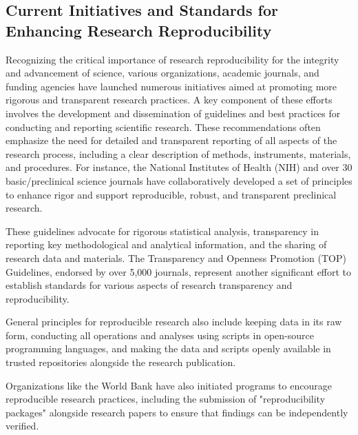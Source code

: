 \documentclass{article}
\begin{document}
\subsection{Current Initiatives and Standards for Enhancing Research Reproducibility}

Recognizing the critical importance of research reproducibility for the integrity and advancement of science, various organizations, academic journals, and funding agencies have launched numerous initiatives aimed at promoting more rigorous and transparent research practices. A key component of these efforts involves the development and dissemination of guidelines and best practices for conducting and reporting scientific research. These recommendations often emphasize the need for detailed and transparent reporting of all aspects of the research process, including a clear description of methods, instruments, materials, and procedures. For instance, the National Institutes of Health (NIH) and over 30 basic/preclinical science journals have collaboratively developed a set of principles to enhance rigor and support reproducible, robust, and transparent preclinical research.

These guidelines advocate for rigorous statistical analysis, transparency in reporting key methodological and analytical information, and the sharing of research data and materials. The Transparency and Openness Promotion (TOP) Guidelines, endorsed by over 5,000 journals, represent another significant effort to establish standards for various aspects of research transparency and reproducibility.

General principles for reproducible research also include keeping data in its raw form, conducting all operations and analyses using scripts in open-source programming languages, and making the data and scripts openly available in trusted repositories alongside the research publication.

Organizations like the World Bank have also initiated programs to encourage reproducible research practices, including the submission of "reproducibility packages" alongside research papers to ensure that findings can be independently verified.
\end{document}
